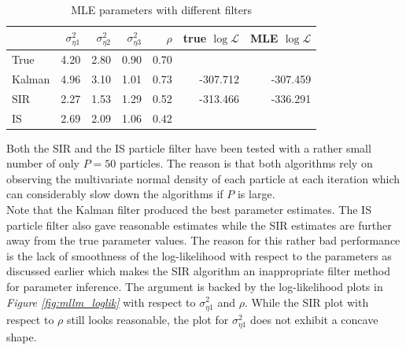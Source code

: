 \documentclass[11pt, oneside]{scrreprt}   	%
\begin{document}
\begin{table}[h!]
\centering
\begin{tabular}{l r r r r r r}
\hline
& $\sigma_{\eta 1}^2$ &  $\sigma_{\eta 2}^2$ & $\sigma_{\eta 3}^2$ & $\rho$ & true $\log \mathcal{L} $ & MLE $\log \mathcal{L} $ \\
\hline
True        & 4.20  & 2.80 &  0.90 & 0.70&  &  \\
Kalman   & 4.96  & 3.10  & 1.01 & 0.73 & -307.712 & -307.459 \\
SIR         & 2.27  & 1.53  & 1.29 & 0.52 & -313.466 & -336.291 \\
IS            & 2.69  & 2.09  & 1.06 & 0.42 &  & \\
\hline
\end{tabular}
\caption{MLE parameters with different filters}
\label{tab:mllm_param_inference}
\end{table}
Both the SIR and the IS particle filter have been tested with a rather small number of only $P=50$ particles. The reason is that both algorithms rely on observing the multivariate normal density of each particle at each iteration which can considerably slow down the algorithms if $P$ is large. \\                              
    
Note that the Kalman filter produced the best parameter estimates. The IS particle filter also gave reasonable estimates while the SIR estimates are further away from the true parameter values. The reason for this rather bad performance is the lack of smoothness of the log-likelihood with respect to the parameters as discussed earlier which makes the SIR algorithm an inappropriate filter method for parameter inference. The argument is backed by the log-likelihood plots in \textit{Figure \ref{fig:mllm_loglik}} with respect to $\sigma_{\eta 1}^2$ and $\rho$. While the SIR plot with respect to $\rho$ still looks reasonable, the plot for $\sigma_{\eta 1}^2$ does not exhibit a concave shape.\\
\end{document}
